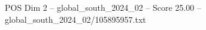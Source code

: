 \begin{textsample}{POS Dim 2 – global\_south\_2024\_02 – Score 25.00 – global\_south\_2024\_02/105895957.txt}
\end{textsample}
